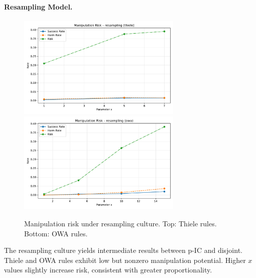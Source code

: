 \documentclass[11pt]{article}
\begin{document}
\paragraph{Resampling Model.}
\begin{figure}[h!]
\centering
\includegraphics[width=0.7\textwidth]{figures/risk_resampling_thiele.pdf}
\includegraphics[width=0.7\textwidth]{figures/risk_resampling_owa.pdf}
\caption{Manipulation risk under resampling culture. Top: Thiele rules. Bottom: OWA rules.}
\end{figure}
The resampling culture yields intermediate results between p-IC and disjoint.
Thiele and OWA rules exhibit low but nonzero manipulation potential. Higher $x$
values slightly increase risk, consistent with greater proportionality.
\end{document}

